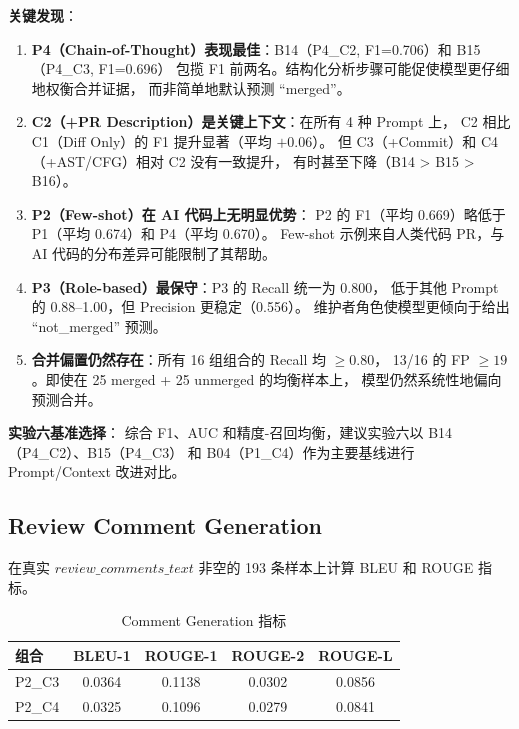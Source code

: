 \documentclass{experimentreport}
\begin{document}
\textbf{关键发现}：

\begin{enumerate}
    \item \textbf{P4（Chain-of-Thought）表现最佳}：B14（P4\_C2, F1=0.706）和 B15（P4\_C3, F1=0.696）
          包揽 F1 前两名。结构化分析步骤可能促使模型更仔细地权衡合并证据，
          而非简单地默认预测 ``merged''。

    \item \textbf{C2（+PR Description）是关键上下文}：在所有 4 种 Prompt 上，
          C2 相比 C1（Diff Only）的 F1 提升显著（平均 $+0.06$）。
          但 C3（+Commit）和 C4（+AST/CFG）相对 C2 没有一致提升，
          有时甚至下降（B14 > B15 > B16）。

    \item \textbf{P2（Few-shot）在 AI 代码上无明显优势}：
          P2 的 F1（平均 0.669）略低于 P1（平均 0.674）和 P4（平均 0.670）。
          Few-shot 示例来自人类代码 PR，与 AI 代码的分布差异可能限制了其帮助。

    \item \textbf{P3（Role-based）最保守}：P3 的 Recall 统一为 0.800，
          低于其他 Prompt 的 0.88--1.00，但 Precision 更稳定（0.556）。
          维护者角色使模型更倾向于给出 ``not\_merged'' 预测。

    \item \textbf{合并偏置仍然存在}：所有 16 组组合的 Recall 均 $\ge 0.80$，
          13/16 的 FP $\ge 19$。即使在 25 merged + 25 unmerged 的均衡样本上，
          模型仍然系统性地偏向预测合并。
\end{enumerate}

\textbf{实验六基准选择}：
综合 F1、AUC 和精度-召回均衡，建议实验六以 B14（P4\_C2）、B15（P4\_C3）
和 B04（P1\_C4）作为主要基线进行 Prompt/Context 改进对比。

\subsection{Review Comment Generation}

在真实 $review\_comments\_text$ 非空的 193 条样本上计算 BLEU 和 ROUGE 指标。

\begin{table}[htbp]
\centering
\caption{Comment Generation 指标}
\begin{tabular}{lcccc}
\toprule
组合 & BLEU-1 & ROUGE-1 & ROUGE-2 & ROUGE-L \\
\midrule
P2\_C3 & 0.0364 & 0.1138 & 0.0302 & 0.0856 \\
P2\_C4 & 0.0325 & 0.1096 & 0.0279 & 0.0841 \\
\bottomrule
\end{tabular}
\end{table}
\end{document}
